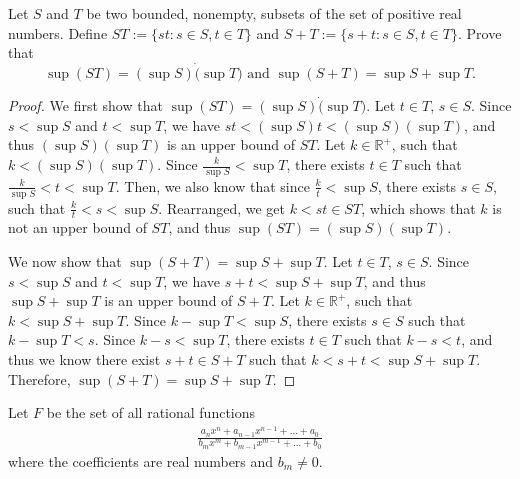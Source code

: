 \documentclass[addpoints, 11pt]{exam}
\newcommand*{\R}{\mathbb{R}}
\newenvironment{question}[1]{\smallskip\noindent\color{crimson}{\bf Question #1.}}{}
\begin{document}
\newpage

\begin{question}{C}
    Let $S$ and $T$ be two bounded, nonempty, subsets of the set of positive real numbers. Define $ST := \{st : s \in S, t \in T\}$ and $S + T := \{s + t : s \in S, t \in T\}$. Prove that 
    \[
        \sup(ST) = (\sup S) \dot (\sup T) \text{ and } \sup(S + T) = \sup S + \sup T.
    \]

\end{question}

\begin{proof}
    We first show that $\sup(ST) = (\sup S) \dot (\sup T)$. Let $t \in T$, $s \in S$. 
    Since $s < \sup S$ and $t < \sup T$, we have $st < (\sup S)t < (\sup S)(\sup T)$, and thus $(\sup S)(\sup T)$ is an upper bound of $ST$. Let $k \in \R^{+}$, such that $k < (\sup S)(\sup T)$. Since $\frac{k}{\sup S} < \sup T$, there exists $t \in T$ such that $\frac{k}{\sup S} < t < \sup T$. Then, we also know that since $\frac{k}{t} < \sup S$, there exists $s \in S$, such that $\frac{k}{t} < s < \sup S$. Rearranged, we get $k < st \in ST$, which shows that $k$ is not an upper bound of $ST$, and thus $\sup(ST) = (\sup S)(\sup T)$.

    We now show that $\sup(S + T) = \sup S + \sup T$. Let $t \in T$, $s \in S$. Since $s < \sup S$ and $t < \sup T$, we have $s + t < \sup S + \sup T$, and thus $\sup S + \sup T$ is an upper bound of $S + T$. Let $k \in \R^{+}$, such that $k < \sup S + \sup T$. Since $k - \sup T < \sup S$, there exists $s \in S$ such that $k - \sup T < s$. Since $k - s < \sup T$, there exists $t \in T$ such that $k - s < t$, and thus we know there exist $s + t \in S + T$ such that $k < s + t < \sup S + \sup T$. Therefore, $\sup(S + T) = \sup S + \sup T$.
\end{proof}

\newpage

\begin{question}{D}
    Let $F$ be the set of all rational functions\
    \begin{gather}
        \frac{a_nx^n + a_{n - 1}x^{n - 1} + \dots + a_0}{b_mx^m + b_{m - 1}x^{m - 1} + \dots + b_0}
    \end{gather}
    where the coefficients are real numbers and $b_m \neq 0$.
\end{question}
\end{document}
